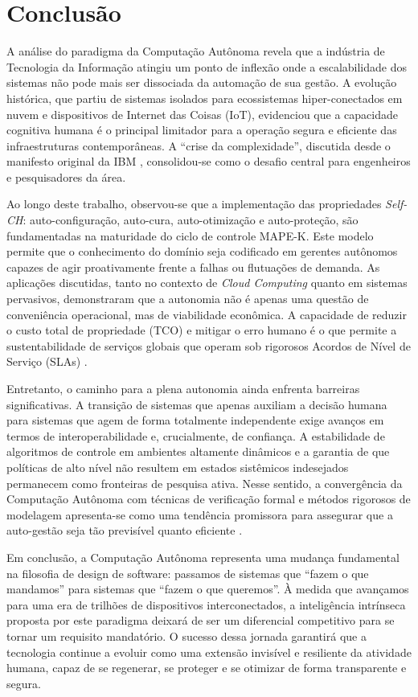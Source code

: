 \section{Conclusão}

A análise do paradigma da Computação Autônoma revela que a indústria de Tecnologia da Informação atingiu um ponto de inflexão onde a escalabilidade dos sistemas não pode mais ser dissociada da automação de sua gestão. A evolução histórica, que partiu de sistemas isolados para ecossistemas hiper-conectados em nuvem e dispositivos de Internet das Coisas (IoT), evidenciou que a capacidade cognitiva humana é o principal limitador para a operação segura e eficiente das infraestruturas contemporâneas. A ``crise da complexidade'', discutida desde o manifesto original da IBM \cite{ibm2001}, consolidou-se como o desafio central para engenheiros e pesquisadores da área.

Ao longo deste trabalho, observou-se que a implementação das propriedades \textit{Self-CH}:  auto-configuração, auto-cura, auto-otimização e auto-proteção, são fundamentadas na maturidade do ciclo de controle MAPE-K. Este modelo permite que o conhecimento do domínio seja codificado em gerentes autônomos capazes de agir proativamente frente a falhas ou flutuações de demanda. As aplicações discutidas, tanto no contexto de \textit{Cloud Computing} quanto em sistemas pervasivos, demonstraram que a autonomia não é apenas uma questão de conveniência operacional, mas de viabilidade econômica. A capacidade de reduzir o custo total de propriedade (TCO) e mitigar o erro humano é o que permite a sustentabilidade de serviços globais que operam sob rigorosos Acordos de Nível de Serviço (SLAs) \cite{sterritt2005, correa2007}.

Entretanto, o caminho para a plena autonomia ainda enfrenta barreiras significativas. A transição de sistemas que apenas auxiliam a decisão humana para sistemas que agem de forma totalmente independente exige avanços em termos de interoperabilidade e, crucialmente, de confiança. A estabilidade de algoritmos de controle em ambientes altamente dinâmicos e a garantia de que políticas de alto nível não resultem em estados sistêmicos indesejados permanecem como fronteiras de pesquisa ativa. Nesse sentido, a convergência da Computação Autônoma com técnicas de verificação formal e métodos rigorosos de modelagem apresenta-se como uma tendência promissora para assegurar que a auto-gestão seja tão previsível quanto eficiente \cite{lalanda2013, kephart2003}.

Em conclusão, a Computação Autônoma representa uma mudança fundamental na filosofia de design de software: passamos de sistemas que ``fazem o que mandamos'' para sistemas que ``fazem o que queremos''. À medida que avançamos para uma era de trilhões de dispositivos interconectados, a inteligência intrínseca proposta por este paradigma deixará de ser um diferencial competitivo para se tornar um requisito mandatório. O sucesso dessa jornada garantirá que a tecnologia continue a evoluir como uma extensão invisível e resiliente da atividade humana, capaz de se regenerar, se proteger e se otimizar de forma transparente e segura.